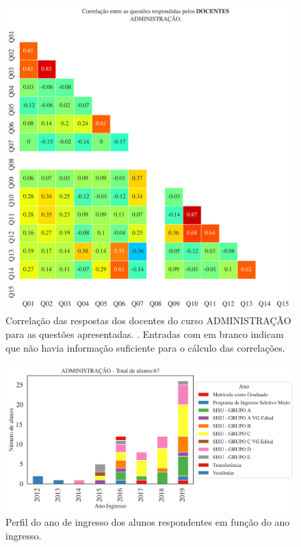 \documentclass[a4paper,10pt]{article}
\begin{document}
\begin{figure}[h]
\centering
\includegraphics[width=0.999\linewidth]{matriz_corr__docentes_1178684.png}
\caption{\label{fig:corr_docentes}Correlação das respostas dos docentes do curso ADMINISTRAÇÃO para as questões apresentadas. . Entradas com em branco indicam que não havia informação suficiente para o cálculo das correlações.}
\end{figure}
\begin{figure}[h]
\centering
\includegraphics[width=0.85\linewidth]{ingresso_discentes_curso_ano_1178684.png}
\caption{\label{fig:ingresso_ano} Perfil do ano de ingresso dos alunos respondentes em função do ano ingresso.}
\end{figure}
\end{document}
